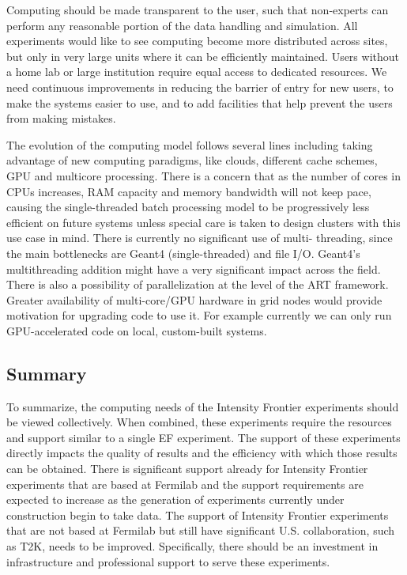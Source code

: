 Computing should be made transparent to the user, such that non-experts can
perform any reasonable portion of the data handling and simulation. All
experiments would like to see computing become more distributed across sites,
but only in very large units where it can be efficiently maintained.  Users
without a home lab or large institution require equal access to dedicated
resources. We need  continuous improvements in reducing the barrier of entry
for new users, to make the systems easier to use, and to add facilities that
help prevent the users from making mistakes.

The evolution of the computing model follows several lines including taking
advantage of new computing paradigms, like clouds, different cache schemes,
GPU and multicore processing. There is a concern that as the number of cores
in CPUs increases, RAM capacity and memory bandwidth will not keep pace,
causing the single-threaded batch processing model to be progressively less
efficient on future systems unless special care is taken to design clusters
with this use case in mind. There is currently no significant use of multi-
threading, since the main bottlenecks are Geant4 (single-threaded) and file
I/O. Geant4's multithreading addition might have a very significant impact
across the field. There is also a possibility of parallelization at the level
of the ART framework. Greater availability of multi-core/GPU hardware in grid
nodes would provide motivation for upgrading code to use it. For example
currently we can only run GPU-accelerated code on local, custom-built systems.

\subsection{Summary}
To summarize, the computing needs of the Intensity Frontier experiments should be viewed
collectively.  When combined, these experiments require the resources and
support similar to a single EF experiment.  The support of these experiments
directly impacts the quality of results and the efficiency with which those
results can be obtained.  There is significant support already for Intensity Frontier
experiments that are based at Fermilab and the support requirements are
expected to increase as the generation of experiments currently under
construction begin to take data.  The support of Intensity Frontier experiments that are not
based at Fermilab but still have significant U.S. collaboration, such as T2K,
needs to be improved.  Specifically, there should be an investment in
infrastructure and professional support to serve these experiments.

